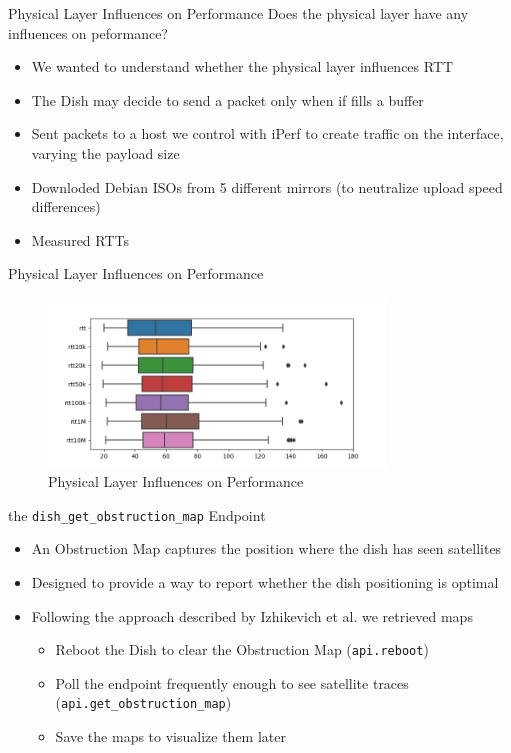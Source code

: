 \documentclass[NET,english,beameralt]{tumbeamer}
\begin{document}
\begin{frame}{Physical Layer Influences on Performance}
    Does the physical layer have any influences on peformance? 
	\begin{itemize}
        \item We wanted to understand whether the physical layer influences RTT
        \item The Dish may decide to send a packet only when if fills a buffer
		\item Sent packets to a host we control with iPerf to create traffic on the interface, varying the payload size
		\item Downloded Debian ISOs from 5 different mirrors (to neutralize upload speed differences)
        \item Measured RTTs 
	\end{itemize}
\end{frame}

\begin{frame}{{Physical Layer Influences on Performance}}
    \begin{figure}
        \includegraphics[width=0.8\textwidth]{pics/rtt-iperf-stress.png}
        \caption{Physical Layer Influences on Performance}
    \end{figure}
\end{frame}

\begin{frame}{the \texttt{dish\_get\_obstruction\_map} Endpoint}
    \begin{itemize}
        \item An Obstruction Map captures the position where the dish has seen satellites
        \item Designed to provide a way to report whether the dish positioning is optimal
        \item Following the approach described by Izhikevich et al. \cite{izhikevich2023democratizing} we retrieved maps
        \begin{itemize}
            \item Reboot the Dish to clear the Obstruction Map (\texttt{api.reboot})
            \item Poll the endpoint frequently enough to see satellite traces (\texttt{api.get\_obstruction\_map})
            \item Save the maps to visualize them later
        \end{itemize}
    \end{itemize}
\end{frame}
\end{document}

